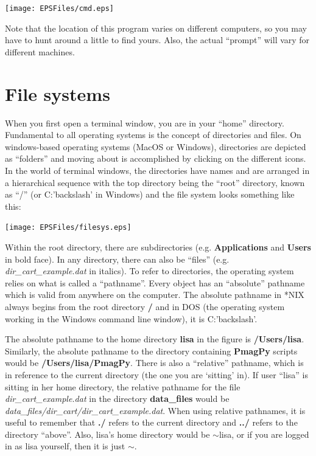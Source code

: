 \documentclass[11pt]{book}
\begin{document}
{  \texttt{[image: EPSFiles/cmd.eps]}

  Note that the location of this program varies on different computers, so you may have to hunt around a little to find yours. Also, the actual  ``prompt'' will vary for different machines.



\section{File systems}
\label{sect:file_systems}
When you first open a terminal window,  you are in your ``home'' directory.
Fundamental to all operating systems is the concept of
directories and files.  On windows-based operating systems (MacOS or Windows), directories are depicted
as ``folders'' and moving about is accomplished by clicking on the different icons.
In the world of terminal windows, the directories have names and are arranged in a hierarchical sequence with
the top directory being the ``root'' directory, known as  ``/'' (or C:'backslash' in Windows) and the file system looks something like this:


  \texttt{[image: EPSFiles/filesys.eps]}

 Within the root directory, there are subdirectories
(e.g. {\bf Applications} and {\bf Users} in bold face).  In any directory, there can also be ``files''
(e.g. {\it dir\_cart\_example.dat} in italics).   To
refer to directories,  the operating system relies on what is called a ``pathname''. Every object
has an ``absolute'' pathname which is valid from anywhere on the computer.  The
absolute pathname in *NIX always begins from the root directory {\bf /} and in DOS (the operating system working in the Windows command line window), it is C:'backslash'.

The absolute pathname to the home directory {\bf lisa} in the figure is {\bf /Users/lisa}.
Similarly, the absolute pathname to the directory containing {\bf PmagPy}
scripts  would be  {\bf /Users/lisa/PmagPy}.  There is also a ``relative'' pathname,
which is in reference to the  current directory (the one you are `sitting' in).  If user ``lisa'' is sitting in
her home directory, the relative pathname for the file {\it dir\_cart\_example.dat} in the directory
{\bf data\_files} would be {\it data\_files/dir\_cart/dir\_cart\_example.dat}.  When using relative
pathnames, it is useful to remember that {\bf ./} refers to the current
directory and {\bf ../} refers to the directory  ``above''.     Also, lisa's home directory would be $\sim$lisa, or if you are logged in as lisa yourself, then it is just $\sim$.


}
\end{document}
